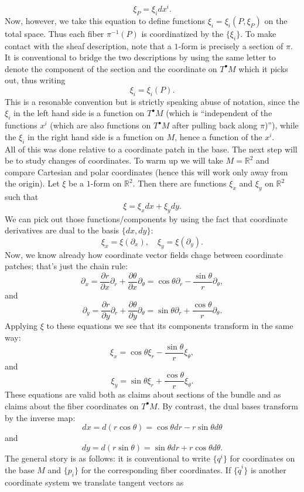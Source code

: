 \documentclass[11pt]{article} %
\begin{document}
$$
\xi_P = \xi_i dx^i.
$$
Now, however, we take this equation to define functions $\xi_i = \xi_i(P, \xi_P)$ on the total space. Thus each fiber $\pi^{-1}(P)$ is coordinatized by the $\{\xi_i\}$. To make contact with the sheaf description, note that a $1$-form is precisely a section of $\pi$. It is conventional to bridge the two descriptions by using the same letter to denote the component of the section and the coordinate on $T^\bullet M$ which it picks out, thus writing
$$
\xi_i = \xi_i(P).
$$
This is a resonable convention but is strictly speaking abuse of notation, since the $\xi_i$ in the left hand side is a function on $T^\bullet M$ (which is ``independent of the functions $x^i$ (which are also functions on $T^\bullet M$ after pulling back along $\pi$)''), while the $\xi_i$ in the right hand side is a function on $M$, hence a function of the $x^i$.\\
All of this was done relative to a coordinate patch in the base. The next step will be to study changes of coordinates. To warm up we will take $M = \mathbb{R}^2$ and compare Cartesian and polar coordinates (hence this will work only away from the origin). Let $\xi$ be a $1$-form on $\mathbb{R}^2$. Then there are functions $\xi_x$ and $\xi_y$ on $\mathbb{R}^2$ such that
$$
\xi = \xi_x dx + \xi_y dy.
$$
We can pick out those functions/components by using the fact that coordinate derivatives are dual to the basis $\{dx, dy\}$:
$$
\xi_x = \xi(\partial_x),\quad \xi_y = \xi(\partial_y).
$$
Now, we know already how coordinate vector fields chage between coordinate patches; that's just the chain rule:
$$
\partial_x = \frac{\partial r}{\partial x}\partial_r + \frac{\partial \theta}{\partial x} \partial_\theta = \cos\theta \partial_r - \frac{\sin\theta}{r} \partial_\theta,
$$
and
$$
\partial_y = \frac{\partial r}{\partial y}\partial_r + \frac{\partial \theta}{\partial y} \partial_\theta =\sin\theta \partial_r + \frac{\cos\theta}{r} \partial_\theta.
$$
Applying $\xi$ to these equations we see that its components transform in the same way:
$$
\xi_x = \cos\theta \xi_r - \frac{\sin\theta}{r} \xi_\theta,
$$
and
$$
\xi_y = \sin\theta \xi_r + \frac{\cos\theta}{r} \xi_\theta.
$$
These equations are valid both as claims about sections of the bundle and as claims about the fiber coordinates on $T^\bullet M$. By contrast, the dual bases transform by the inverse map:
$$
dx = d(r \cos\theta) = \cos\theta dr  - r \sin\theta d\theta
$$
and
$$
dy = d(r \sin\theta) = \sin\theta dr + r \cos\theta d\theta.
$$
The general story is as follows: it is conventional to write $\{q^i\}$ for coordinates on the base $M$ and $\{p_i\}$ for the corresponding fiber coordinates. If  $\{\tilde{q}^i\}$ is another coordinate system we translate tangent vectors as 
\end{document}
